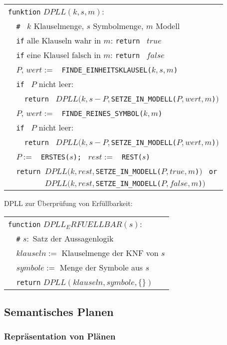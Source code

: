 \begin{center}
\begin{tabular}{l}
\verb|funktion| $DPLL(k,s,m)$: \\
\verb|  # | $k$ Klauselmenge, $s$ Symbolmenge, $m$ Modell \\
\verb|  if| alle Klauseln wahr in $m$: \verb|return | $true$ \\
\verb|  if| eine Klausel falsch in $m$: \verb|return | $false$ \\
\verb|  |$P, \, wert :=$ \verb| FINDE_EINHEITSKLAUSEL(|$k,s,m$\verb|)| \\
\verb|  if | $P$ nicht leer: \\
\verb|    return | $DPLL(k,s-P,$\verb|SETZE_IN_MODELL(|$P,wert,m$\verb|)|$)$ \\
\verb|  |$P, \, wert :=$ \verb| FINDE_REINES_SYMBOL(|$k,m$\verb|)| \\
\verb|  if | $P$ nicht leer: \\
\verb|    return | $DPLL(k,s-P,$\verb|SETZE_IN_MODELL(|$P,wert,m$\verb|)|$)$ \\
\verb|  |$P :=$ \verb| ERSTES(|$s$\verb|); | $rest :=$ \verb| REST(|$s$\verb|)| \\
\verb|  return |$DPLL(k, rest,$\verb|SETZE_IN_MODELL(|$P,true,m$\verb|)|$)$ \verb| or| \\
\verb|         |$DPLL(k, rest,$\verb|SETZE_IN_MODELL(|$P,false,m$\verb|)|$)$
\end{tabular}
\end{center}
DPLL zur Überprüfung von Erfüllbarkeit:
\begin{center}
\begin{tabular}{l}
\verb|function| $DPLL_ERFUELLBAR(s):$ \\
\verb|  #| $s:$ Satz der Aussagenlogik \\
\verb|  | $klauseln :=$ Klauselmenge der KNF von $s$ \\
\verb|  | $symbole :=$ Menge der Symbole aus $s$ \\
\verb|  return| $DPLL(klauseln, symbole, \{\})$
\end{tabular}
\end{center}

\subsection{Semantisches Planen}

\subsubsection*{Repräsentation von Plänen}

